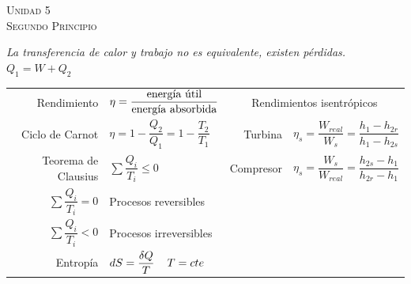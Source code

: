 \documentclass[11pt,a4paper,twocolumn]{article}
\newcommand{\unidad}[2]{\begin{center}
		\fontsize{10}{10}\selectfont\color{gray!50!black}\scshape Unidad #1 \\
		\fontsize{14}{14}\selectfont \scshape #2
	\end{center} \vspace{-.5cm}}
\begin{document}
\hspace{-9.1cm}
\begin{minipage}{17cm}
	\begin{center}
		\unidad{5}{Segundo Principio}
		\vspace{.4cm}
	\end{center}
		\begin{tcolorbox}[colback=white!97!brown, colframe=brown!15!gray]
		\begin{center}
			\emph{La transferencia de calor y trabajo no es equivalente, existen pérdidas.}\\
			
			$Q_{1}=W+Q_{2}$
		\end{center}
		\begin{tabular}{r l r l }
			\vspace{.1cm}		Rendimiento & $\eta = \dfrac{\textup{energía útil}}{\textup{energía absorbida}}$ & 	\multicolumn{2}{c}{Rendimientos isentrópicos}\\
			\vspace{.1cm}		Ciclo de Carnot & $\eta = 1 - \dfrac{Q_{2}}{Q_{1}}=1-\dfrac{T_{2}}{T_{1}}$ & Turbina & $\eta_{s} =\dfrac{W_{real}}{W_{s}}=\dfrac{h_{1}-h_{2r}}{h_{1}-h_{2s}}$ \\
			\vspace{.1cm}		Teorema de Clausius & $\displaystyle\sum \dfrac{Q_{i}}{T_{i}} \leq 0$ &
			Compresor & $\eta_{s}=\dfrac{W_{s}}{W_{real}}=\dfrac{h_{2s}-h_{1}}{h_{2r}-h_{1}}$	\\
			\vspace{.1cm}		$\displaystyle\sum \dfrac{Q_{i}}{T_{i}} = 0$ & Procesos reversibles &&\\
			\vspace{.1cm}		$\displaystyle\sum \dfrac{Q_{i}}{T_{i}} < 0$ & Procesos irreversibles&& \\
			\vspace{.1cm}		Entropía & $dS =\dfrac{\delta Q}{T} \hspace{.4cm} T=cte$&&\\
		\end{tabular}

\end{tcolorbox}
\end{minipage}
\end{document}
